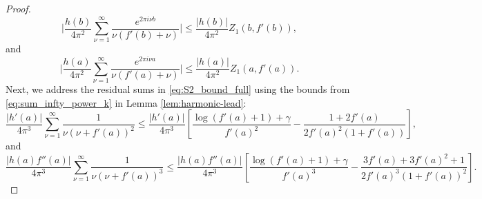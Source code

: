 \documentclass[11pt,letterpaper,oneside,reqno]{amsart}
\renewcommand{\^}[1]{\widehat{#1}}
\numberwithin{equation}{section}
\theoremstyle{remark}
\begin{document}
\begin{proof}
\begin{equation}
    \bigg| \frac{h(b)}{4\pi^2} \sum_{\nu=1}^\infty \frac{e^{2\pi i \nu b}}{\nu(f'(b)+\nu)} \bigg|  \leq \frac{|h(b)|}{4\pi^2 }Z_1(b,f'(b)), \label{eq:S2_bound_b}
\end{equation}
and
\begin{equation}
    \bigg| \frac{h(a)}{4\pi^2} \sum_{\nu=1}^\infty \frac{e^{2\pi i \nu a}}{\nu(f'(a)+\nu)} \bigg|  \leq \frac{|h(a)|}{4\pi^2 }Z_1(a,f'(a)). \label{eq:S2_bound_a}
\end{equation}
Next, we address the residual sums in \eqref{eq:S2_bound_full} using the bounds from \eqref{eq:sum_infty_power_k} in Lemma \ref{lem:harmonic-lead}:
\begin{equation}
\frac{|h'(a)|}{4\pi^3} \sum_{\nu=1}^\infty \frac{1}{\nu(\nu+f'(a))^2} \leq \frac{|h'(a)|}{4\pi^3} \left[ \frac{\log(f'(a)+1)+\gamma}{f'(a)^2} - \frac{1+2f'(a)}{2f'(a)^2(1+f'(a))} \right], 
\label{eq:S2_bound_+nu_power2_refined}
\end{equation}
and
\begin{equation}
\frac{|h(a)f''(a)|}{4\pi^3} \sum_{\nu=1}^\infty \frac{1}{\nu(\nu+f'(a))^3} \leq \frac{|h(a)f''(a)|}{4\pi^3} \left[ \frac{\log(f'(a)+1)+\gamma}{f'(a)^3} - \frac{3f'(a)+3f'(a)^2+1}{2f'(a)^3(1+f'(a))^2} \right]. 
\label{eq:S2_bound_+nu_power3_refined}
\end{equation}


\end{proof}
\end{document}
